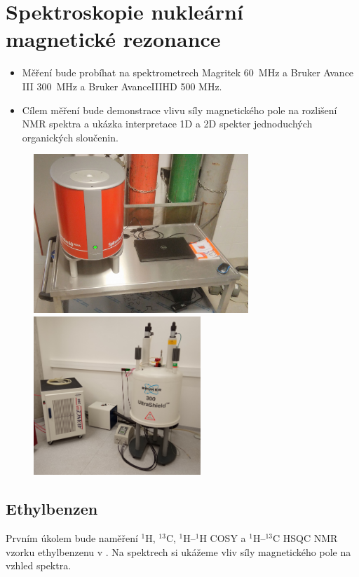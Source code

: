 \documentclass[12pt]{article}
\begin{document}
\newpage
\section{Spektroskopie nukleární magnetické rezonance}
\begin{itemize}
	\item Měření bude probíhat na spektrometrech Magritek 60~MHz a Bruker Avance III 300~MHz a Bruker AvanceIIIHD 500 MHz.
	\item Cílem měření bude demonstrace vlivu síly magnetického pole na rozlišení NMR spektra a ukázka interpretace 1D a 2D spekter jednoduchých organických sloučenin.
\end{itemize}

\begin{figure}[h]
	\includegraphics[keepaspectratio,height=6cm]{img/Magritek.jpg}
	\includegraphics[keepaspectratio,height=6cm]{img/NMR300-1S12.jpg}
\end{figure}

\subsection{Ethylbenzen}

Prvním úkolem bude naměření $^1$H, $^{13}$C, $^1$H--$^1$H COSY a $^1$H--$^{13}$C HSQC NMR vzorku ethylbenzenu v . Na spektrech si ukážeme vliv síly magnetického pole na vzhled spektra.
\end{document}
